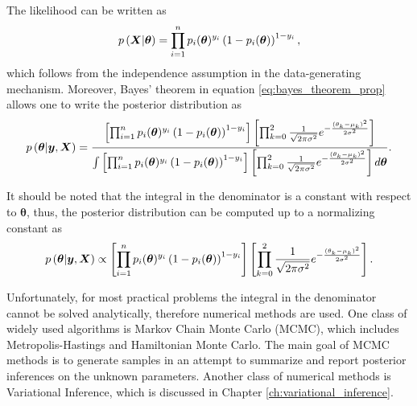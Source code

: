 The likelihood can be written as
\begin{equation}
  p\left( \boldsymbol{X} | \boldsymbol{\theta} \right) = \prod_{i = 1}^n  p_i(\boldsymbol{\theta})^{y_i}\left(1 - p_i(\boldsymbol{\theta}) \right)^{1 - y_i},
\end{equation}
which follows from the independence assumption in the data-generating mechanism. Moreover, Bayes' theorem in equation \eqref{eq:bayes_theorem_prop} allows one to write the posterior distribution as
\begin{equation}
  p\left( \boldsymbol{\theta} | \boldsymbol{y}, \boldsymbol{X} \right) =
    \frac
    {
      \left[ \prod_{i = 1}^n  p_i(\boldsymbol{\theta})^{y_i}\left(1 - p_i(\boldsymbol{\theta}) \right)^{1 - y_i} \right]
      \left[ \prod_{k = 0}^2 \frac{1}{\sqrt{2 \pi \sigma^2}} e^{- \frac{(\theta_k - \mu_k)^2}{2\sigma^2}} \right]
    }{
      \int \left[ \prod_{i = 1}^n  p_i(\boldsymbol{\theta})^{y_i}\left(1 - p_i(\boldsymbol{\theta}) \right)^{1 - y_i} \right]
      \left[ \prod_{k = 0}^2 \frac{1}{\sqrt{2 \pi \sigma^2}} e^{- \frac{(\theta_k - \mu_k)^2}{2\sigma^2}} \right] d\boldsymbol{\theta}
    }.
\end{equation}

It should be noted that the integral in the denominator is a constant with respect to $\boldsymbol{\theta}$, thus, the posterior distribution can be computed up to a normalizing constant as
\begin{equation}
  p\left( \boldsymbol{\theta} | \boldsymbol{y}, \boldsymbol{X} \right) \propto
  \left[ \prod_{i = 1}^n  p_i(\boldsymbol{\theta})^{y_i}\left(1 - p_i(\boldsymbol{\theta}) \right)^{1 - y_i} \right]
  \left[ \prod_{k = 0}^2 \frac{1}{\sqrt{2 \pi \sigma^2}} e^{- \frac{(\theta_k - \mu_k)^2}{2\sigma^2}} \right].
\end{equation}

Unfortunately, for most practical problems the integral in the denominator cannot be solved analytically, therefore numerical methods are used. One class of widely used algorithms is Markov Chain Monte Carlo (MCMC), which includes Metropolis-Hastings and Hamiltonian Monte Carlo. The main goal of MCMC methods is to generate samples in an attempt to summarize and report posterior inferences on the unknown parameters. Another class of numerical methods is Variational Inference, which is discussed in Chapter \ref{ch:variational_inference}.

